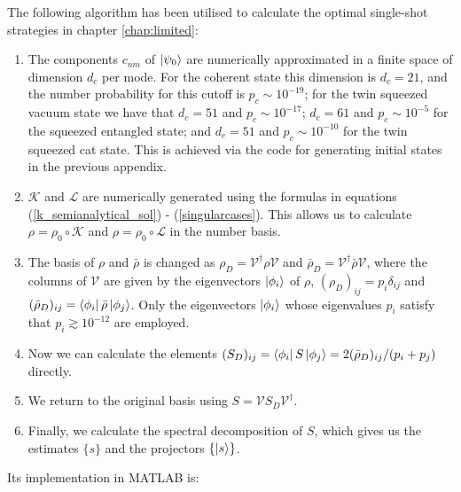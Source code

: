 The following algorithm has been utilised to calculate the optimal single-shot strategies in chapter \ref{chap:limited}:
\begin{enumerate}
\item The components $c_{nm}$ of $\ket{\psi_0}$ are numerically approximated in a finite space of dimension $d_c$ per mode. For the coherent state this dimension is $d_c=21$, and the number probability for this cutoff is $p_c \sim 10^{-19}$; for the twin squeezed vacuum state we have that $d_c = 51$ and $p_c \sim 10^{-17}$; $d_c = 61$ and $p_c \sim 10^{-5}$ for the squeezed entangled state; and $d_c = 51$ and $p_c \sim 10^{-10}$ for the twin squeezed cat state. This is achieved via the code for generating initial states in the previous appendix.
\item $\mathcal{K}$ and $\mathcal{L}$ are numerically generated using the formulas in equations (\ref{k_semianalytical_sol}) - (\ref{singularcases}). This allows us to calculate $\rho = \rho_0 \circ \mathcal{K}$ and $\rho = \rho_0 \circ \mathcal{L}$ in the number basis.
\item The basis of $\rho$ and $\bar{\rho}$ is changed as $\rho_D = \mathcal{V}^\dagger \rho \mathcal{V}$ and $\bar{\rho}_D = \mathcal{V}^\dagger \bar{\rho} \mathcal{V}$, where the columns of $\mathcal{V}$ are given by the eigenvectors $\ket{\phi_i}$ of $\rho$, $(\rho_D)_{ij} = p_i\delta_{ij}$ and $(\bar{\rho}_D)_{ij} = \bra{\phi_i} \bar{\rho} \ket{\phi_j}$.
Only the eigenvectors $\ket{\phi_i}$ whose eigenvalues $p_i$ satisfy that $p_i \gtrsim 10^{-12}$ are employed. 
\item Now we can calculate the elements $(S_D)_{ij} = \bra{\phi_i} S \ket{\phi_j}=2(\bar{\rho}_D)_{ij}/(p_i + p_j)$ directly.
\item We return to the original basis using $S=\mathcal{V} S_D \mathcal{V}^\dagger$.
\item Finally, we calculate the spectral decomposition of $S$, which gives us the estimates $\lbrace s\rbrace$ and the projectors $\lbrace \ket{s}\rbrace$.
\end{enumerate}
Its implementation in MATLAB is:

